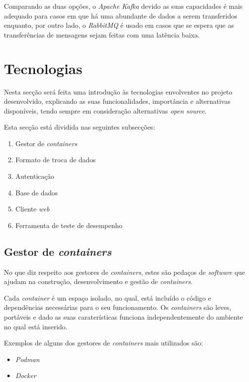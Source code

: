 Comparando as duas opções, o \textit{Apache Kafka} devido as suas capacidades é mais adequado para casos em que há uma abundante de dados a serem transferidos enquanto, por outro lado, o \textit{RabbitMQ} é usado em casos que se espera que as transferências de mensagens sejam feitas com uma latência baixa.


\section{Tecnologias}

Nesta secção será feita uma introdução às tecnologias envolventes no projeto desenvolvido, explicando as suas funcionalidades, importância e alternativas disponíveis, tendo sempre em consideração alternativas \textit{open source}. 

Esta secção está dividida nas seguintes subsecções:

\begin{enumerate}
    \item Gestor de \textit{containers}
    \item Formato de troca de dados
    \item Autenticação
    \item Base de dados
    \item Cliente \textit{web}
    \item Ferramenta de teste de desempenho
\end{enumerate}

\subsection{Gestor de \textit{containers}}
No que diz respeito aos gestores de \textit{containers}, estes são pedaços de \textit{software} que ajudam na construção, desenvolvimento e gestão de \textit{containers}.

Cada \textit{container} é um espaço isolado, no qual, está incluído o código e dependências necessárias para o seu funcionamento. Os \textit{containers} são leves, portáveis e dado as suas caraterísticas funciona independentemente do ambiente no qual está inserido.

Exemplos de alguns dos gestores de \textit{containers} mais utilizados são:
\begin{itemize}
    \item \textit{Podman} \cite{podman}
    \item \textit{Docker} \cite{docker}
\end{itemize}


